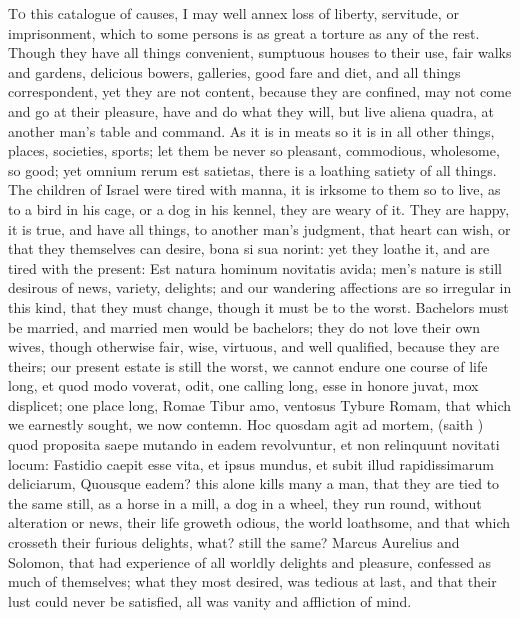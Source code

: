{{\lettrine{T}{o} this catalogue of causes, I may well annex loss of liberty,
servitude, or imprisonment, which to some persons is as great a torture
as any of the rest. Though they have all things convenient, sumptuous
houses to their use, fair walks and gardens, delicious bowers,
galleries, good fare and diet, and all things correspondent, yet they
are not content, because they are confined, may not come and go at
their pleasure, have and do what they will, but live aliena
quadra, at another man's table and command. As it is in meats so
it is in all other things, places, societies, sports; let them be never
so pleasant, commodious, wholesome, so good; yet omnium rerum est
satietas, there is a loathing satiety of all things. The children of
Israel were tired with manna, it is irksome to them so to live, as to a
bird in his cage, or a dog in his kennel, they are weary of it. They
are happy, it is true, and have all things, to another man's judgment,
that heart can wish, or that they themselves can desire, bona si sua
norint: yet they loathe it, and are tired with the present: Est natura
hominum novitatis avida; men's nature is still desirous of news,
variety, delights; and our wandering affections are so irregular in
this kind, that they must change, though it must be to the worst.
Bachelors must be married, and married men would be bachelors; they do
not love their own wives, though otherwise fair, wise, virtuous, and
well qualified, because they are theirs; our present estate is still
the worst, we cannot endure one course of life long, et quod modo
voverat, odit, one calling long, esse in honore juvat, mox displicet;
one place long, Romae Tibur amo, ventosus Tybure Romam, that
which we earnestly sought, we now contemn. Hoc quosdam agit ad mortem,
(saith \Seneca) quod proposita saepe mutando in eadem revolvuntur,
et non relinquunt novitati locum: Fastidio caepit esse vita, et ipsus
mundus, et subit illud rapidissimarum deliciarum, Quousque eadem? this
alone kills many a man, that they are tied to the same still, as a
horse in a mill, a dog in a wheel, they run round, without alteration
or news, their life groweth odious, the world loathsome, and that which
crosseth their furious delights, what? still the same? Marcus Aurelius
and Solomon, that had experience of all worldly delights and pleasure,
confessed as much of themselves; what they most desired, was tedious at
last, and that their lust could never be satisfied, all was vanity and
affliction of mind.

}}

